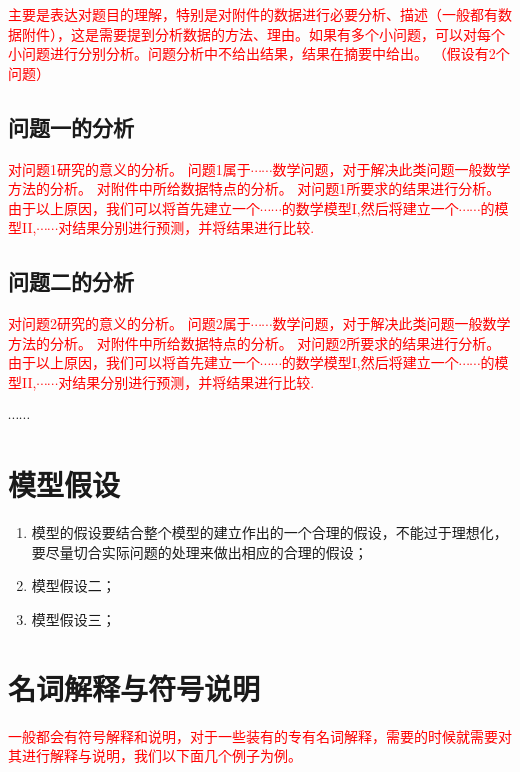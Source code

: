 \documentclass[a4paper]{nmmcm}
\begin{document}
\textcolor{red}{主要是表达对题目的理解，特别是对附件的数据进行必要分析、描述（一般都有数据附件），这是需要提到分析数据的方法、理由。如果有多个小问题，可以对每个小问题进行分别分析。问题分析中不给出结果，结果在摘要中给出。
（假设有2个问题）}

\subsection{问题一的分析}

 \textcolor{red}{对问题1研究的意义的分析。
问题1属于$\cdots\cdots$数学问题，对于解决此类问题一般数学方法的分析。
对附件中所给数据特点的分析。
对问题1所要求的结果进行分析。
由于以上原因，我们可以将首先建立一个$\cdots\cdots$的数学模型I,然后将建立一个$\cdots\cdots$的模型II,$\cdots\cdots$对结果分别进行预测，并将结果进行比较.
}


\subsection{问题二的分析}
 \textcolor{red}{对问题2研究的意义的分析。
问题2属于$\cdots\cdots$数学问题，对于解决此类问题一般数学方法的分析。
对附件中所给数据特点的分析。
对问题2所要求的结果进行分析。
由于以上原因，我们可以将首先建立一个$\cdots\cdots$的数学模型I,然后将建立一个$\cdots\cdots$的模型II,$\cdots\cdots$对结果分别进行预测，并将结果进行比较.
}

 $\cdots\cdots$


\section{模型假设}
\begin{enumerate}
  \item 模型的假设要结合整个模型的建立作出的一个合理的假设，不能过于理想化，要尽量切合实际问题的处理来做出相应的合理的假设；
  \item 模型假设二；
  \item 模型假设三；
\end{enumerate}



\section{名词解释与符号说明}

\textcolor{red}{一般都会有符号解释和说明，对于一些装有的专有名词解释，需要的时候就需要对其进行解释与说明，我们以下面几个例子为例。}
\end{document}
